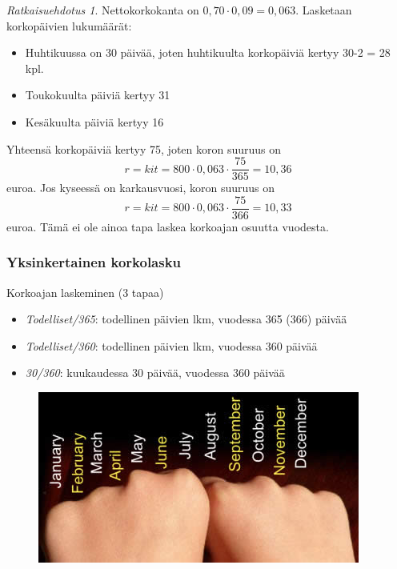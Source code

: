 \documentclass[]{beamer}\usepackage[]{graphicx}\usepackage[]{color}
\theoremstyle{remark}
\newtheorem{ratkaisu}{Ratkaisuehdotus}
\begin{document}
\begin{frame}
    \begin{ratkaisu}
        Nettokorkokanta on \(0,70\cdot0,09 = 0,063\). Lasketaan korkopäivien lukumäärät:\pause
        \begin{itemize}
            \item Huhtikuussa on 30 päivää, joten huhtikuulta korkopäiviä kertyy 30-2 = 28 kpl.\pause
            \item Toukokuulta päiviä kertyy 31\pause
            \item Kesäkuulta päiviä kertyy 16
        \end{itemize}
        Yhteensä korkopäiviä kertyy 75, joten koron suuruus on\pause
        \[
            r = kit = 800\cdot 0,063\cdot \frac{75}{365} = 10,36
        \]
        euroa. \pause Jos kyseessä on karkausvuosi, koron suuruus on
        \[
            r = kit = 800\cdot 0,063\cdot \frac{75}{366} = 10,33
        \]
        euroa. \pause Tämä ei ole ainoa tapa laskea korkoajan osuutta vuodesta.
    \end{ratkaisu}
\end{frame}

\begin{frame}
    \frametitle{Yksinkertainen korkolasku}
    \begin{block}{Korkoajan laskeminen (3 tapaa)}
        \begin{itemize}
            \item \emph{Todelliset/365}: todellinen päivien lkm, vuodessa 365 (366) päivää
            \item \emph{Todelliset/360}: todellinen päivien lkm, vuodessa 360 päivää
            \item \emph{30/360}: kuukaudessa 30 päivää, vuodessa 360 päivää
        \end{itemize}
    \end{block}
    \pause
    \begin{figure}
        \includegraphics[scale=0.7]{months}
    \end{figure}
\end{frame}
\end{document}
